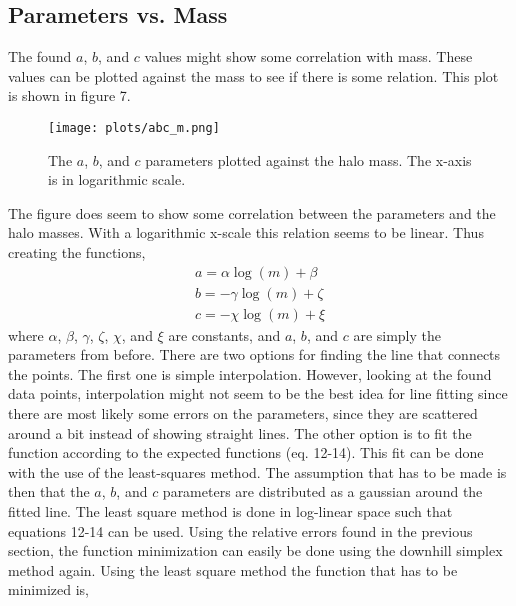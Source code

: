 \subsection{Parameters vs. Mass}
The found $a$, $b$, and $c$ values might show some correlation with mass. These values can be plotted against the mass to see if there is some relation. This plot is shown in figure 7.

\begin{figure}[h]
\centering
\texttt{[image: plots/abc\_m.png]}
\caption{The $a$, $b$, and $c$ parameters plotted against the halo mass. The x-axis is in logarithmic scale.}
\end{figure}
The figure does seem to show some correlation between the parameters and the halo masses. With a logarithmic x-scale this relation seems to be linear. Thus creating the functions,
\begin{gather}
a = \alpha\log(m) + \beta\\
b = -\gamma\log(m) + \zeta\\
c = -\chi\log(m) + \xi
\end{gather}
where $\alpha$, $\beta$, $\gamma$, $\zeta$, $\chi$, and $\xi$ are constants, and $a$, $b$, and $c$ are simply the parameters from before. There are two options for finding the line that connects the points. The first one is simple interpolation. However, looking at the found data points, interpolation might not seem to be the best idea for line fitting since there are most likely some errors on the parameters, since they are scattered around a bit instead of showing straight lines. The other option is to fit the function according to the expected functions (eq. 12-14). This fit can be done with the use of the least-squares method. The assumption that has to be made is then that the $a$, $b$, and $c$ parameters are distributed as a gaussian around the fitted line. The least square method is done in log-linear space such that equations 12-14 can be used. Using the relative errors found in the previous section, the function minimization can easily be done using the downhill simplex method again. Using the least square method the function that has to be minimized is,

